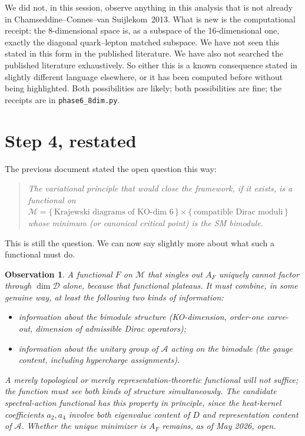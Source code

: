\documentclass[11pt,a4paper]{article}
\newtheorem{observation}[theorem]{Observation}
\begin{document}
We did not, in this session, observe anything in this analysis that is not
already in Chamseddine--Connes--van Suijlekom~2013. What is new is the
computational receipt: the 8-dimensional space is, as a subspace of the
16-dimensional one, exactly the diagonal quark--lepton matched subspace.
We have not seen this stated in this form in the published literature.
We have also not searched the published literature exhaustively. So either
this is a known consequence stated in slightly different language elsewhere,
or it has been computed before without being highlighted. Both possibilities
are likely; both possibilities are fine; the receipts are in
\texttt{phase6\_8dim.py}.

\section{Step 4, restated}\label{sec:step4-sharpened}

The previous document stated the open question this way:

\begin{quote}\itshape
The variational principle that would close the framework, if it exists, is a
functional on $\mathcal{M} = \{\,\text{Krajewski diagrams of KO-dim~6}\,\}
\times \{\,\text{compatible Dirac moduli}\,\}$ whose minimum (or canonical
critical point) is the SM bimodule.
\end{quote}

This is still the question. We can now say slightly more about what such a
functional must do.

\begin{observation}\label{obs:step4-shape}
A functional $F$ on $\mathcal{M}$ that singles out $A_F$ uniquely cannot
factor through $\dim \mathcal{D}$ alone, because that functional plateaus.
It must combine, in some genuine way, at least the following two kinds of
information:
\begin{itemize}[leftmargin=2em,nosep]
  \item information about the bimodule structure (KO-dimension, order-one
        carve-out, dimension of admissible Dirac operators);
  \item information about the unitary group of $\mathcal{A}$ acting on the
        bimodule (the gauge content, including hypercharge assignments).
\end{itemize}
A merely topological or merely representation-theoretic functional will not
suffice; the function must see both kinds of structure simultaneously. The
candidate spectral-action functional has this property in principle, since the
heat-kernel coefficients $a_2, a_4$ involve both eigenvalue content of $D$
and representation content of $\mathcal{A}$. Whether the unique minimizer is
$A_F$ remains, as of May 2026, open.
\end{observation}
\end{document}
